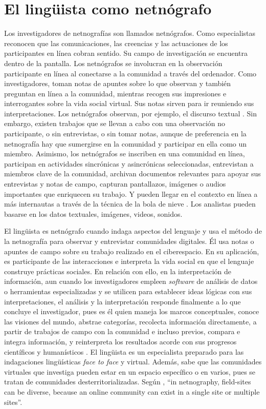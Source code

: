 \section{El lingüista como netnógrafo
}\label{sec-ellinguistacomonetnografo}

Los investigadores de netnografías son llamados netnógrafos. Como
especialistas reconocen que las comunicaciones, las creencias y las
actuaciones de los participantes en línea cobran sentido. Su campo de
investigación se encuentra dentro de la pantalla. Los netnógrafos se
involucran en la observación participante en línea al conectarse a la
comunidad a través del ordenador. Como investigadores, toman notas de
apuntes sobre lo que observan y también preguntan en línea a la
comunidad, mientras recogen sus impresiones e interrogantes sobre la
vida social virtual. Sus notas sirven para ir reuniendo sus
interpretaciones. Los netnógrafos observan, por ejemplo, el discurso
textual \cite{kozinets2002}. Sin embargo, existen trabajos que se llevan a
cabo con una observación no participante, o sin entrevistas, o sin tomar
notas, aunque de preferencia en la netnografía hay que sumergirse en la
comunidad y participar en ella como un miembro. Asimismo, los
netnógrafos se inscriben en una comunidad en línea, participan en
actividades sincrónicas y asincrónicas seleccionadas, entrevistan a
miembros clave de la comunidad, archivan documentos relevantes para
apoyar sus entrevistas y notas de campo, capturan pantallazos, imágenes
o audios importantes que enriquecen su trabajo. Y pueden llegar en el
contexto en línea a más internautas a través de la técnica de la bola de
nieve \cite{Ardèvol_Lanzeni_2014}. Los analistas pueden basarse en los
datos textuales, imágenes, videos, sonidos.

El lingüista es netnógrafo cuando indaga aspectos del lenguaje y usa el
método de la netnografía para observar y entrevistar comunidades
digitales. Él usa notas o apuntes de campo sobre su trabajo realizado en
el ciberespacio. En su aplicación, es participante de las interacciones
e interpreta la vida social en que el lenguaje construye prácticas
sociales. En relación con ello, en la interpretación de información, aun
cuando los investigadores empleen \emph{software} de análisis de datos o
herramientas especializadas y se utilicen para establecer ideas lógicas
con sus interpretaciones, el análisis y la interpretación responde
finalmente a lo que concluye el investigador, pues es él quien maneja
los marcos conceptuales, conoce las visiones del mundo, abstrae
categorías, recolecta información directamente, a partir de trabajos de
campo con la comunidad e incluso previos, compara e integra información,
y reinterpreta los resultados acorde con sus progresos científicos y
humanísticos \cite[p. 10]{sanchez2017}. El lingüista es un
especialista preparado para las indagaciones lingüísticas \emph{face to
face} y virtual. Además, sabe que las comunidades virtuales que
investiga pueden estar en un espacio específico o en varios, pues se
tratan de comunidades desterritorializadas. Según \textcite[p. 4]{kulavuz-onalvásquez2013}, ``in netnography, field-sites can be diverse, because an
online community can exist in a single site or multiple sites''.


